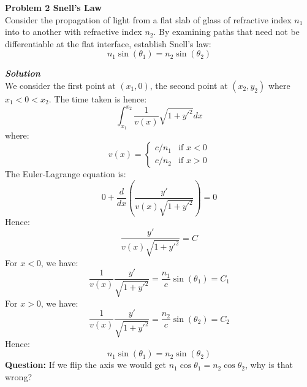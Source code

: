 \begin{framed}
\textbf{\textbf{Problem 2} Snell's Law}\\
Consider the propagation of light from a flat slab of glass of refractive index $n_1$ into to
another with refractive index $n_2$. By examining paths that need not be differentiable
at the flat interface, establish Snell's law:
\begin{equation}
n_1\sin(\theta_1) = n_2\sin(\theta_2)
\end{equation}
\end{framed}

\begin{framed}
\textbf{\textit{Solution}}\\
We consider the first point at $(x_1, 0)$, the second point at $(x_2,y_2)$ where $x_1<0<x_2$. The time taken is hence:
\begin{equation}
\int_{x_1}^{x_2} \frac{1}{v(x)}\sqrt{1+y'^2}dx
\end{equation}
where:
\begin{equation}
v(x)=
\begin{cases}
    c/n_1 &\text{if } x<0 \\
    c/n_2 &\text{if } x>0
\end{cases}
\end{equation}
The Euler-Lagrange equation is:
\begin{equation}
0 + \frac{d}{dx}\left( \frac{y'}{v(x)\sqrt{1+y'^2}} \right)=0
\end{equation}
Hence:
\begin{equation}
\frac{y'}{v(x)\sqrt{1+y'^2}} =C
\end{equation}
For $x<0$, we have:
\begin{equation}
\frac{1}{v(x)}\frac{y'}{\sqrt{1+y'^2}} = \frac{n_1}{c}\sin(\theta_1) = C_1
\end{equation}
For $x>0$, we have:
\begin{equation}
\frac{1}{v(x)}\frac{y'}{\sqrt{1+y'^2}} = \frac{n_2}{c}\sin(\theta_2) = C_2
\end{equation}
Hence:
\begin{equation}
n_1\sin(\theta_1)=n_2\sin(\theta_2)
\end{equation}
\textbf{Question:} If we flip the axis we would get $n_1\cos\theta_1=n_2\cos\theta_2$, why is that wrong?
\end{framed}

